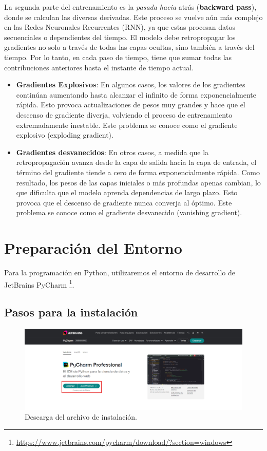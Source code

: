 \documentclass{article}
\begin{document}
La segunda parte del entrenamiento es la \textit{pasada hacia} atrás (\textbf{backward pass}), donde se calculan las diversas derivadas. Este proceso se vuelve aún más complejo en las Redes Neuronales Recurrentes (RNN), ya que estas procesan datos secuenciales o dependientes del tiempo. El modelo debe retropropagar los gradientes no solo a través de todas las capas ocultas, sino también a través del tiempo. Por lo tanto, en cada paso de tiempo, tiene que sumar todas las contribuciones anteriores hasta el instante de tiempo actual. \\

\begin{itemize}
    \item \textbf{Gradientes Explosivos}: En algunos casos, los valores de los gradientes continúan aumentando hasta alcanzar el infinito de forma exponencialmente rápida. Esto provoca actualizaciones de pesos muy grandes y hace que el descenso de gradiente diverja, volviendo el proceso de entrenamiento extremadamente inestable. Este problema se conoce como el gradiente explosivo (exploding gradient).
    \item \textbf{Gradientes desvanecidos}: En otros casos, a medida que la retropropagación avanza desde la capa de salida hacia la capa de entrada, el término del gradiente tiende a cero de forma exponencialmente rápida. Como resultado, los pesos de las capas iniciales o más profundas apenas cambian, lo que dificulta que el modelo aprenda dependencias de largo plazo. Esto provoca que el descenso de gradiente nunca converja al óptimo. Este problema se conoce como el gradiente desvanecido (vanishing gradient).
\end{itemize}

\newpage

\section{Preparación del Entorno}
Para la programación en Python, utilizaremos el entorno de desarrollo de JetBrains PyCharm \footnote{\url{https://www.jetbrains.com/pycharm/download/?section=windows}}.

\subsection{Pasos para la instalación}
\begin{figure}[H]
    \centering
    \includegraphics[scale=0.3]{py1.png}
    \caption{Descarga del archivo de instalación.}
\end{figure}
\end{document}
